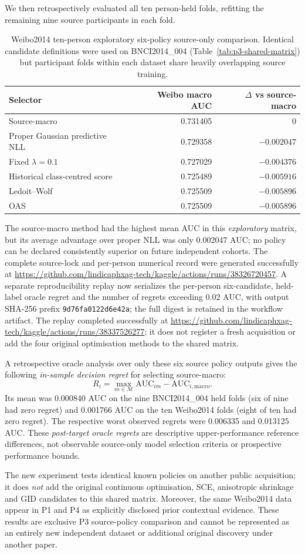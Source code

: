We then retrospectively evaluated all ten
person-held folds, refitting the remaining
nine source participants in each fold.
\begin{table}[tb]
\centering\small
\caption{Weibo2014 ten-person exploratory
six-policy source-only comparison.
Identical candidate definitions were used
on BNCI2014\_004 (Table~\ref{tab:p3-shared-matrix})
but participant folds within each dataset
share heavily overlapping source training.}
\label{tab:p3-weibo-common}
\begin{tabular}{lrr}
\toprule
Selector & Weibo macro AUC & $\Delta$ vs source-macro\\
\midrule
Source-macro & 0.731405 & 0\\
Proper Gaussian predictive NLL & 0.729358 & $-0.002047$\\
Fixed $\lambda=0.1$ & 0.727029 & $-0.004376$\\
Historical class-centred score & 0.725489 & $-0.005916$\\
Ledoit--Wolf & 0.725509 & $-0.005896$\\
OAS & 0.725509 & $-0.005896$\\
\bottomrule
\end{tabular}
\end{table}
The source-macro method had the highest
mean AUC in this \emph{exploratory}
matrix, but its average advantage over
proper NLL was only 0.002047 AUC;
no policy can be declared consistently
superior on future independent cohorts.
The complete source-lock and per-person
numerical record were generated successfully at
\url{https://github.com/lindicaphxag-tech/kaggle/actions/runs/38326720457}.
A separate reproducibility replay now serializes the
per-person six-candidate, held-label oracle regret
and the number of regrets exceeding 0.02 AUC,
with output SHA-256 prefix \texttt{9d76fa0122d6e42a};
the full digest is retained in the workflow artifact.
The replay completed successfully at
\url{https://github.com/lindicaphxag-tech/kaggle/actions/runs/38337526277};
it does not register a fresh acquisition or add the four
original optimisation methods to the shared matrix.

A retrospective oracle analysis over only these
six source policy outputs gives the following
\emph{in-sample decision regret} for selecting
source-macro:
\[
R_i=\max_{m\in\mathcal M}\mathrm{AUC}_{im}
-\mathrm{AUC}_{i,\mathrm{macro}}.
\]
Its mean was 0.000840 AUC on the nine
BNCI2014\_004 held folds (six of nine
had zero regret) and 0.001766 AUC
on the ten Weibo2014 folds (eight
of ten had zero regret). The respective
worst observed regrets were 0.006335
and 0.013125 AUC. These
\emph{post-target oracle regrets} are
descriptive upper-performance reference
differences, not observable source-only
model selection criteria or prospective
performance bounds.

The new experiment tests identical known
policies on another public acquisition; it
does \emph{not} add the original continuous
optimisation, SCE, anisotropic shrinkage and GID
candidates to this shared matrix. Moreover,
the same Weibo2014 data appear in P1 and
P4 as explicitly disclosed prior contextual
evidence. These results are exclusive
P3 source-policy comparison and cannot
be represented as an entirely new independent
dataset or additional original discovery
under another paper.
